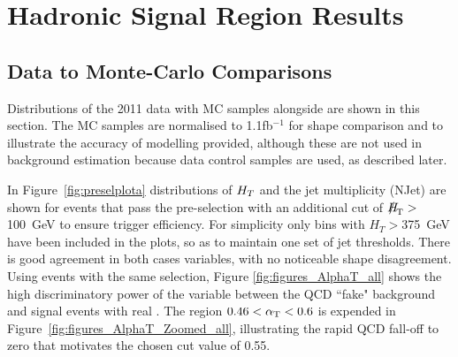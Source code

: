 \section{Hadronic Signal Region Results}
\subsection{Data to Monte-Carlo Comparisons }

Distributions of the 2011 data with MC samples alongside are shown in this section. The MC samples are normalised to 1.1fb$^{-1}$ for shape comparison and to illustrate the accuracy of modelling provided, although these are not used in background estimation because data control samples are used, as described later.

In Figure~\ref{fig:preselplota} distributions of $H_{T}$ and the jet multiplicity (NJet) are shown for events that pass the pre-selection with an additional cut of $\MHT >$ 100~GeV to ensure trigger efficiency. For simplicity only bins with $H_{T} > $375~GeV have been included in the plots, so as to maintain one set of jet thresholds. There is good agreement in both cases variables, with no noticeable shape disagreement. Using events with the same selection, Figure \ref{fig:figures_AlphaT_all} shows the high discriminatory power of the \alt variable between the QCD ``fake" \MET background and signal events with real \MET. The region $0.46 < \alpha_{\text{T}} < 0.6$ is expended in Figure~\ref{fig:figures_AlphaT_Zoomed_all}, illustrating the rapid QCD fall-off to zero that motivates the chosen cut value of 0.55.

